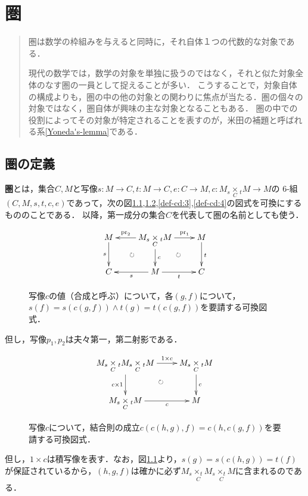 \documentclass[uplatex, dvipdfmx]{jsreport}
\begin{document}
\chapter{圏}

\begin{quotation}
    圏は数学の枠組みを与えると同時に，それ自体１つの代数的な対象である．

    現代の数学では，数学の対象を単独に扱うのではなく，それと似た対象全体のなす圏の一員として捉えることが多い．
    こうすることで，対象自体の構成よりも，圏の中の他の対象との関わりに焦点が当たる．圏の個々の対象ではなく，圏自体が興味の主な対象となることもある．
    圏の中での役割によってその対象が特定されることを表すのが，米田の補題と呼ばれる系\ref{Yoneda's-lemma}である．\cite{数学原論}
\end{quotation}

\section{圏の定義}

\begin{definition}[category]\label{def-category}
    \textbf{圏}とは，集合$C,M$と写像$s:M\to C,t:M\to C,e:C\to M, c:M_s\underset{C}{\times}{}_tM \to M$の
    6-組$(C,M,s,t,c,e)$であって，次の図\ref{def-cd:1},\ref{def-cd:2},\ref{def-cd:3},\ref{def-cd:4}の図式を可換にするもののことである．
    以降，第一成分の集合$C$を代表して圏の名前としても使う．
\end{definition}

\begin{figure}[h]
    \[
    \xymatrix{
        M\ar[d]_-s\ar@{}[dr]|\circlearrowright&{M_s\underset{C}{\times}{}_tM}\ar[l]_-{\pr_2}\ar[r]^-{\pr_1}\ar[d]^-c&M\ar@{}[dl]|\circlearrowright\ar[d]^t\\
        C&M\ar[l]^-s\ar[r]_-t&C
    }
    \]
    \caption{写像$c$の値（合成と呼ぶ）について，各$(g,f)$について，$s(f)=s(c(g,f))\land t(g)=t(c(g,f))$を要請する可換図式．}\label{def-cd:1}
\end{figure}
但し，写像$p_1, p_2$は夫々第一，第二射影である．

\begin{figure}[h]
    \[
    \xymatrix{
        {M_s\underset{C}{\times}{}_tM_s\underset{C}{\times}{}_tM}\ar[r]^-{1\times c}\ar[d]_-{c\times 1}\ar@{}[dr]|\circlearrowright&{M_s\underset{C}{\times}{}_tM}\ar[d]^-c\\
        {M_s\underset{C}{\times}{}_tM}\ar[r]_-c&M
    }
    \]
    \caption{写像$c$について，結合則の成立$c(c(h,g),f)=c(h,c(g,f))$を要請する可換図式．}\label{def-cd:2}
\end{figure}
但し，$1\times c$は積写像を表す．なお，図\ref{def-cd:1}より，$s(g)=s(c(h,g))=t(f)$が保証されているから，$(h,g,f)$は確かに必ず$M_s \underset{C}{\times_t}M_s \underset{C}{\times_t}M$に含まれるのである．
\end{document}
